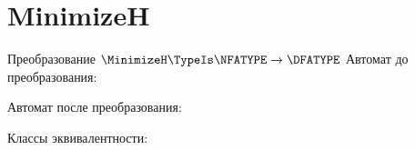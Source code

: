 \section{MinimizeH}
\begin{frame}{Преобразование $\MinimizeH\TypeIs\NFATYPE\to\DFATYPE$}
	Автомат до преобразования:




	Автомат после преобразования:%


	Классы эквивалентности:




\end{frame}
